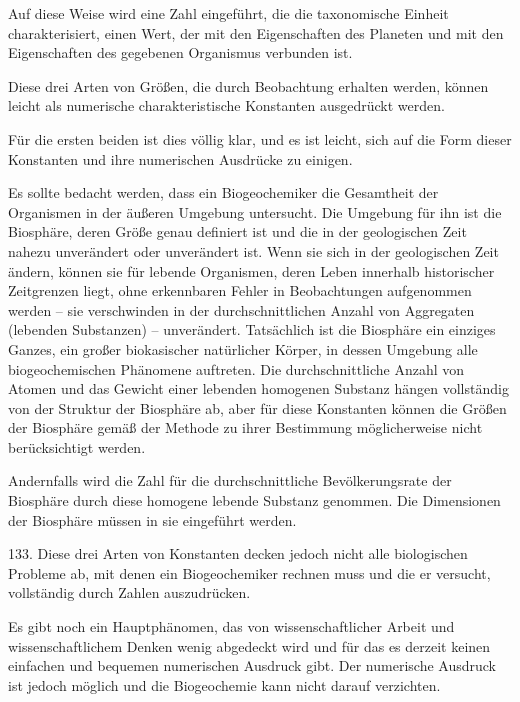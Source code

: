 \documentclass[11pt,a4paper]{book}
\begin{document}
Auf diese Weise wird eine Zahl eingeführt, die die taxonomische Einheit charakterisiert, einen Wert, der mit den Eigenschaften des Planeten und mit den Eigenschaften des gegebenen Organismus verbunden ist.



Diese drei Arten von Größen, die durch Beobachtung erhalten werden, können leicht als numerische charakteristische Konstanten ausgedrückt werden.



Für die ersten beiden ist dies völlig klar, und es ist leicht, sich auf die Form dieser Konstanten und ihre numerischen Ausdrücke zu einigen.



Es sollte bedacht werden, dass ein Biogeochemiker die Gesamtheit der Organismen in der äußeren Umgebung untersucht. Die Umgebung für ihn ist die Biosphäre, deren Größe genau definiert ist und die in der geologischen Zeit nahezu unverändert oder unverändert ist. Wenn sie sich in der geologischen Zeit ändern, können sie für lebende Organismen, deren Leben innerhalb historischer Zeitgrenzen liegt, ohne erkennbaren Fehler in Beobachtungen aufgenommen werden -- sie verschwinden in der durchschnittlichen Anzahl von Aggregaten (lebenden Substanzen) -- unverändert. Tatsächlich ist die Biosphäre ein einziges Ganzes, ein großer biokasischer natürlicher Körper, in dessen Umgebung alle biogeochemischen Phänomene auftreten. Die durchschnittliche Anzahl von Atomen und das Gewicht einer lebenden homogenen Substanz hängen vollständig von der Struktur der Biosphäre ab, aber für diese Konstanten können die Größen der Biosphäre gemäß der Methode zu ihrer Bestimmung möglicherweise nicht berücksichtigt werden.



Andernfalls wird die Zahl für die durchschnittliche Bevölkerungsrate der Biosphäre durch diese homogene lebende Substanz genommen. Die Dimensionen der Biosphäre müssen in sie eingeführt werden.



133. Diese drei Arten von Konstanten decken jedoch nicht alle biologischen Probleme ab, mit denen ein Biogeochemiker rechnen muss und die er versucht, vollständig durch Zahlen auszudrücken.



Es gibt noch ein Hauptphänomen, das von wissenschaftlicher Arbeit und wissenschaftlichem Denken wenig abgedeckt wird und für das es derzeit keinen einfachen und bequemen numerischen Ausdruck gibt. Der numerische Ausdruck ist jedoch möglich und die Biogeochemie kann nicht darauf verzichten.
\end{document}
